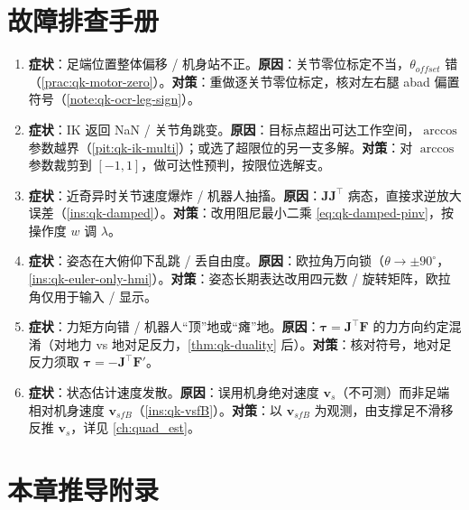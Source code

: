 \section*{故障排查手册}
\begin{enumerate}
  \item \textbf{症状}：足端位置整体偏移 / 机身站不正。\textbf{原因}：关节零位标定不当，$\theta_{offset}$ 错（\cref{prac:qk-motor-zero}）。\textbf{对策}：重做逐关节零位标定，核对左右腿 abad 偏置符号（\cref{note:qk-ocr-leg-sign}）。
  \item \textbf{症状}：IK 返回 NaN / 关节角跳变。\textbf{原因}：目标点超出可达工作空间，$\arccos$ 参数越界（\cref{pit:qk-ik-multi}）；或选了超限位的另一支多解。\textbf{对策}：对 $\arccos$ 参数裁剪到 $[-1,1]$，做可达性预判，按限位选解支。
  \item \textbf{症状}：近奇异时关节速度爆炸 / 机器人抽搐。\textbf{原因}：$\mathbf{J}\mathbf{J}^\top$ 病态，直接求逆放大误差（\cref{ins:qk-damped}）。\textbf{对策}：改用阻尼最小二乘 \cref{eq:qk-damped-pinv}，按操作度 $w$ 调 $\lambda$。
  \item \textbf{症状}：姿态在大俯仰下乱跳 / 丢自由度。\textbf{原因}：欧拉角万向锁（$\theta\to\pm90^\circ$，\cref{ins:qk-euler-only-hmi}）。\textbf{对策}：姿态长期表达改用四元数 / 旋转矩阵，欧拉角仅用于输入 / 显示。
  \item \textbf{症状}：力矩方向错 / 机器人“顶”地或“瘫”地。\textbf{原因}：$\boldsymbol{\tau}=\mathbf{J}^\top\mathbf{F}$ 的力方向约定混淆（对地力 vs 地对足反力，\cref{thm:qk-duality} 后）。\textbf{对策}：核对符号，地对足反力须取 $\boldsymbol{\tau}=-\mathbf{J}^\top\mathbf{F}'$。
  \item \textbf{症状}：状态估计速度发散。\textbf{原因}：误用机身绝对速度 $\boldsymbol{v}_s$（不可测）而非足端相对机身速度 $\boldsymbol{v}_{sfB}$（\cref{ins:qk-vsfB}）。\textbf{对策}：以 $\boldsymbol{v}_{sfB}$ 为观测，由支撑足不滑移反推 $\boldsymbol{v}_s$，详见 \cref{ch:quad_est}。
\end{enumerate}

\section{本章推导附录}
\label{sec:qk-appendix}

